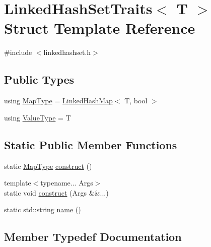 \hypertarget{structstanfordcpplib_1_1collections_1_1LinkedHashSetTraits}{}\section{Linked\+Hash\+Set\+Traits$<$ T $>$ Struct Template Reference}
\label{structstanfordcpplib_1_1collections_1_1LinkedHashSetTraits}


{\ttfamily \#include $<$linkedhashset.\+h$>$}

\subsection*{Public Types}
\begin{DoxyCompactItemize}
\item 
using \mbox{\hyperlink{structstanfordcpplib_1_1collections_1_1LinkedHashSetTraits_acce9edc55bd035cd3f1e667afc3d8341}{Map\+Type}} = \mbox{\hyperlink{classLinkedHashMap}{Linked\+Hash\+Map}}$<$ T, bool $>$
\item 
using \mbox{\hyperlink{structstanfordcpplib_1_1collections_1_1LinkedHashSetTraits_aecaeabaa9da616ae42bb20787878260d}{Value\+Type}} = T
\end{DoxyCompactItemize}
\subsection*{Static Public Member Functions}
\begin{DoxyCompactItemize}
\item 
static \mbox{\hyperlink{structstanfordcpplib_1_1collections_1_1LinkedHashSetTraits_acce9edc55bd035cd3f1e667afc3d8341}{Map\+Type}} \mbox{\hyperlink{structstanfordcpplib_1_1collections_1_1LinkedHashSetTraits_ac811d1b6f02a0a95b10438adb8c41345}{construct}} ()
\item 
{\footnotesize template$<$typename... Args$>$ }\\static void \mbox{\hyperlink{structstanfordcpplib_1_1collections_1_1LinkedHashSetTraits_a7d1c802036cf3e2e07cb1f3b8affea7c}{construct}} (Args \&\&...)
\item 
static std\+::string \mbox{\hyperlink{structstanfordcpplib_1_1collections_1_1LinkedHashSetTraits_a7fb46594d295b98500539251135502bc}{name}} ()
\end{DoxyCompactItemize}


\subsection{Member Typedef Documentation}
\mbox{\label{structstanfordcpplib_1_1collections_1_1LinkedHashSetTraits_acce9edc55bd035cd3f1e667afc3d8341}} 
